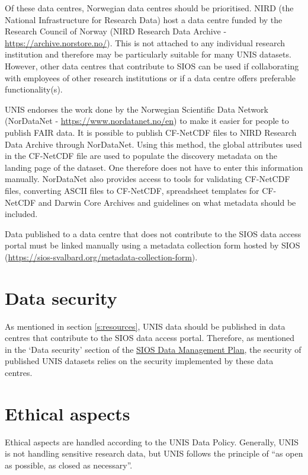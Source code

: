 \documentclass[a4paper,english, 11pt]{article}
\begin{document}
Of these data centres, Norwegian data centres should be prioritised. NIRD (the National Infrastructure for Research Data) host a data centre funded by the Research Council of Norway (NIRD Research Data Archive - \url{https://archive.norstore.no/}). This is not attached to any individual research institution and therefore may be particularly suitable for many UNIS datasets. However, other data centres that contribute to SIOS can be used if collaborating with employees of other research institutions or if a data centre offers preferable functionality(s).

UNIS endorses the work done by the Norwegian Scientific Data Network (NorDataNet - \url{https://www.nordatanet.no/en}) to make it easier for people to publish FAIR data. It is possible to publish CF-NetCDF files to NIRD Research Data Archive through NorDataNet. Using this method, the global attributes used in the CF-NetCDF file are used to populate the discovery metadata on the landing page of the dataset. One therefore does not have to enter this information manually. NorDataNet also provides access to tools for validating CF-NetCDF files, converting ASCII files to CF-NetCDF, spreadsheet templates for CF-NetCDF and Darwin Core Archives and guidelines on what metadata should be included. 

Data published to a data centre that does not contribute to the SIOS data access portal must be linked manually using a metadata collection form hosted by SIOS (\url{https://sios-svalbard.org/metadata-collection-form}).  

\section{Data security}
\label{s:security}

As mentioned in section \ref{s:resources}, UNIS data should be published in data centres that contribute to the SIOS data access portal. Therefore, as mentioned in the `Data security' section of the \href{https://sios-svalbard.org/sites/sios-svalbard.org/files/common/SIOS_Data_Management_Plan.pdf}{SIOS Data Management Plan}, the security of published UNIS datasets relies on the security implemented by these data centres.

\section{Ethical aspects}
\label{s:ethics}

Ethical aspects are handled according to the UNIS Data Policy. Generally, UNIS is not handling sensitive research data, but UNIS follows the principle of ``as open as possible, as closed as necessary''.
\end{document}
